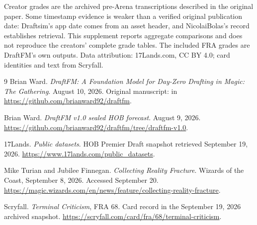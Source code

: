 \documentclass[11pt]{article}
\newcommand{\code}[1]{\texttt{\detokenize{#1}}}
\begin{document}
Creator grades are the archived pre-Arena transcriptions described in the
original paper. Some timestamp evidence is weaker than a verified original
publication date: Draftsim's app date comes from an asset header, and
NicolaiBolas's record establishes retrieval. This supplement reports
aggregate comparisons and does not reproduce the creators' complete grade
tables. The included FRA grades are DraftFM's own outputs. Data attribution:
17Lands.com, CC BY 4.0; card identities and text from Scryfall.

\begin{thebibliography}{9}
 Brian Ward. \emph{DraftFM: A Foundation Model for Day-Zero
Drafting in Magic: The Gathering}. August 10, 2026.
Original manuscript: \code{paper/draftfm.tex} in
\url{https://github.com/brianward92/draftfm}.

 Brian Ward. \emph{DraftFM v1.0 sealed HOB forecast}.
August 9, 2026. \url{https://github.com/brianward92/draftfm/tree/draftfm-v1.0}.

 17Lands. \emph{Public datasets}. HOB Premier Draft snapshot
retrieved September 19, 2026. \url{https://www.17lands.com/public_datasets}.

 Mike Turian and Jubilee Finnegan. \emph{Collecting Reality
Fracture}. Wizards of the Coast, September 8, 2026. Accessed September 20.
\url{https://magic.wizards.com/en/news/feature/collecting-reality-fracture}.

 Scryfall. \emph{Terminal Criticism}, FRA 68.
Card record in the September 19, 2026 archived snapshot.
\url{https://scryfall.com/card/fra/68/terminal-criticism}.
\end{thebibliography}
\end{document}
